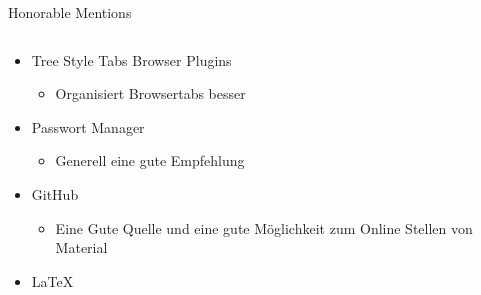 \documentclass[aspectratio=169,shownotes]{beamer}
\begin{document}
\begin{frame}{Honorable Mentions}
\begin{columns}[t]
\begin{column}{0.6\textwidth}
\begin{itemize}
\begin{itemize}
                \end{itemize}  
                \item Tree Style Tabs Browser Plugins
                \begin{itemize}
                    \item Organisiert Browsertabs besser
                \end{itemize}  
                \item Passwort Manager
                \begin{itemize}
                    \item Generell eine gute Empfehlung
                \end{itemize}  
                \item GitHub
                \begin{itemize}
                    \item Eine Gute Quelle und eine gute Möglichkeit zum Online Stellen von Material
                \end{itemize} 
                \item \LaTeX  
            \end{itemize}
        \end{column}
    \end{columns}
\end{frame}
\end{document}
